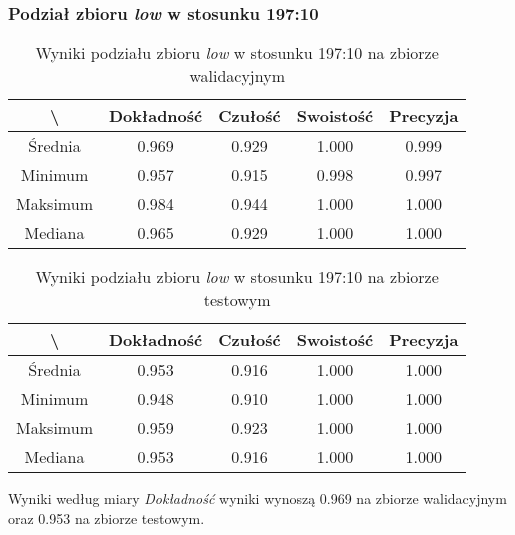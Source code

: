 \subsubsection{Podział zbioru \textit{low} w stosunku 197:10}


\begin{table}[H]
	\centering
	\caption{Wyniki podziału zbioru \textit{low} w stosunku 197:10 na zbiorze walidacyjnym}
	\vspace{6pt}
	{\footnotesize
		\begin{tabular}{|c|c|c|c|c|}
      \hline \textbackslash & Dokładność & Czułość & Swoistość & Precyzja \\
      \hline Średnia & 0.969 & 0.929 & 1.000 & 0.999 \\
      \hline Minimum & 0.957 & 0.915 & 0.998 & 0.997 \\
      \hline Maksimum & 0.984 & 0.944 & 1.000 & 1.000 \\
      \hline Mediana & 0.965 & 0.929 & 1.000 & 1.000 \\
      \hline
    \end{tabular}
    \label{Tab:lowsplita_val}
	}
	\vspace{0pt}
\end{table}

\begin{table}[H]
	\centering
	\caption{Wyniki podziału zbioru \textit{low} w stosunku 197:10 na zbiorze testowym}
	\vspace{6pt}
	{\footnotesize
		\begin{tabular}{|c|c|c|c|c|}
      \hline \textbackslash & Dokładność & Czułość & Swoistość & Precyzja \\
      \hline Średnia & 0.953 & 0.916 & 1.000 & 1.000 \\
      \hline Minimum & 0.948 & 0.910 & 1.000 & 1.000 \\
      \hline Maksimum & 0.959 & 0.923 & 1.000 & 1.000 \\
      \hline Mediana & 0.953 & 0.916 & 1.000 & 1.000 \\
      \hline
    \end{tabular}
    \label{Tab:lowsplita_test}
	}
	\vspace{0pt}
\end{table}

Wyniki według miary \textit{Dokładność} wyniki wynoszą 0.969 na zbiorze walidacyjnym oraz 0.953 na zbiorze testowym.

